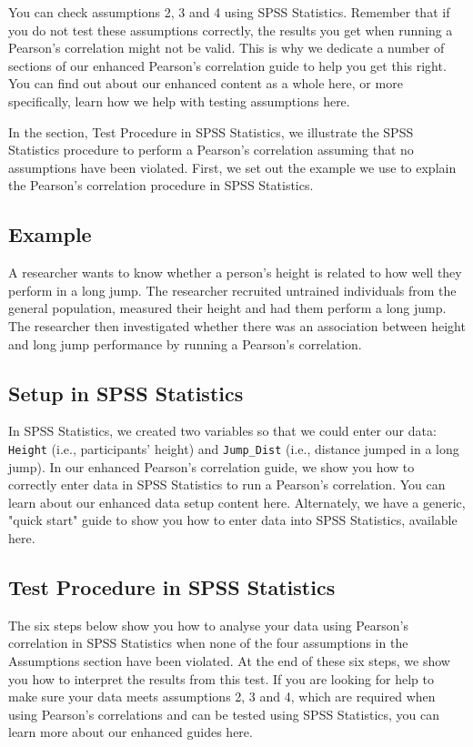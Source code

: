 \documentclass[]{article}
\begin{document}
You can check assumptions 2, 3 and 4 using SPSS Statistics. Remember that if you do not test these assumptions correctly, the results you get when running a Pearson's correlation might not be valid. This is why we dedicate a number of sections of our enhanced Pearson's correlation guide to help you get this right. You can find out about our enhanced content as a whole here, or more specifically, learn how we help with testing assumptions here.

In the section, Test Procedure in SPSS Statistics, we illustrate the SPSS Statistics procedure to perform a Pearson’s correlation assuming that no assumptions have been violated. First, we set out the example we use to explain the Pearson’s correlation procedure in SPSS Statistics.

\subsection{Example}
A researcher wants to know whether a person's height is related to how well they perform in a long jump. The researcher recruited untrained individuals from the general population, measured their height and had them perform a long jump. The researcher then investigated whether there was an association between height and long jump performance by running a Pearson's correlation.

\subsection{Setup in SPSS Statistics}
In SPSS Statistics, we created two variables so that we could enter our data: \texttt{Height} (i.e., participants' height) and \texttt{Jump\_Dist} (i.e., distance jumped in a long jump). In our enhanced Pearson's correlation guide, we show you how to correctly enter data in SPSS Statistics to run a Pearson's correlation. You can learn about our enhanced data setup content here. Alternately, we have a generic, "quick start" guide to show you how to enter data into SPSS Statistics, available here.

\subsection*{Test Procedure in SPSS Statistics}
The six steps below show you how to analyse your data using Pearson’s correlation in SPSS Statistics when none of the four assumptions in the Assumptions section have been violated. At the end of these six steps, we show you how to interpret the results from this test. If you are looking for help to make sure your data meets assumptions 2, 3 and 4, which are required when using Pearson’s correlations and can be tested using SPSS Statistics, you can learn more about our enhanced guides here.
\end{document}
